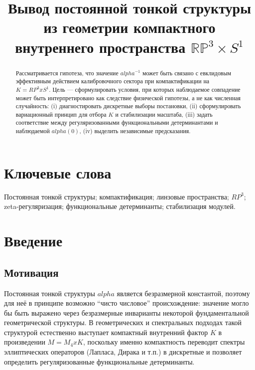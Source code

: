 \documentclass[12pt]{article}
\title{Вывод постоянной тонкой структуры из геометрии компактного внутреннего пространства $\mathbb{RP}^3\times S^1$}
\author{}
\date{}
\def\mathbb#1{#1}%
\def\alpha{alpha}%
\def\times{x}%
\begin{document}
\maketitle

\begin{abstract}
Рассматривается гипотеза, что значение $\alpha^{-1}$ может быть связано с евклидовым эффективным действием калибровочного сектора при компактификации на $K=\mathbb{RP}^3\times S^1$.
Цель --- сформулировать условия, при которых наблюдаемое совпадение может быть интерпретировано как следствие физической гипотезы, а не как численная случайность: (i) диагностировать дискретные выборы постановки, (ii) сформулировать вариационный принцип для отбора $K$ и стабилизации масштаба, (iii) задать соответствие между регуляризованными функциональными детерминантами и наблюдаемой $\alpha(0)$, (iv) выделить независимые предсказания.
\end{abstract}

\section*{Ключевые слова}
Постоянная тонкой структуры; компактификация; линзовые пространства; $\mathbb{RP}^3$; zeta-регуляризация; функциональные детерминанты; стабилизация модулей.

\section{Введение}
\subsection{Мотивация}
Постоянная тонкой структуры $\alpha$ является безразмерной константой, поэтому для неё в принципе возможно ``чисто числовое'' происхождение: значение могло бы быть выражено через безразмерные инварианты некоторой фундаментальной геометрической структуры.
В геометрических и спектральных подходах такой структурой естественно выступает компактный внутренний фактор $K$ в произведении $M=M_4\times K$, поскольку именно компактность переводит спектры эллиптических операторов (Лапласа, Дирака и т.п.) в дискретные и позволяет определить регуляризованные функциональные детерминанты.
\end{document}
